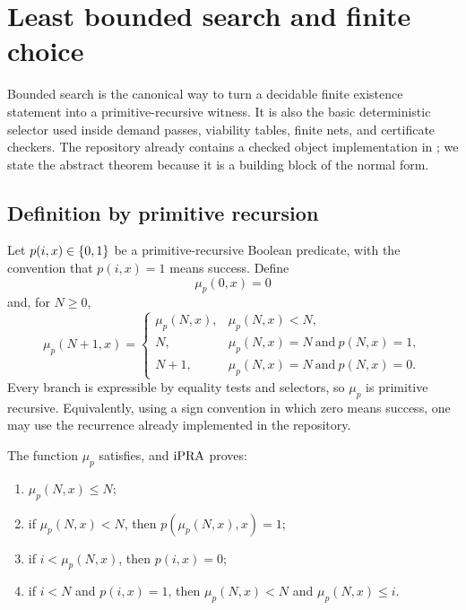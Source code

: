 \section{Least bounded search and finite choice}
\label{sec:search}

Bounded search is the canonical way to turn a decidable finite existence statement
into a primitive-recursive witness.  It is also the basic deterministic selector used
inside demand passes, viability tables, finite nets, and certificate checkers.  The
repository already contains a checked object implementation in
; we state the abstract theorem because it is a
building block of the normal form.

\subsection{Definition by primitive recursion}

Let \(p(i,x)\in\{0,1\}\) be a primitive-recursive Boolean predicate, with the convention
that \(p(i,x)=1\) means success.  Define
\[
 \mu_p(0,x)=0
\]
and, for \(N\ge0\),
\[
 \mu_p(N+1,x)=
 \begin{cases}
   \mu_p(N,x),&\mu_p(N,x)<N,\\
   N,&\mu_p(N,x)=N\ \text{and}\ p(N,x)=1,\\
   N+1,&\mu_p(N,x)=N\ \text{and}\ p(N,x)=0.
 \end{cases}
\]
Every branch is expressible by equality tests and selectors, so \(\mu_p\) is primitive
recursive.  Equivalently, using a sign convention in which zero means success, one may
use the recurrence already implemented in the repository.

\begin{theorem}
\label{thm:bounded-search}
The function \(\mu_p\) satisfies, and \(\mathrm{iPRA}\) proves:
\begin{enumerate}[label=(\roman*),leftmargin=2.4em]
\item \(\mu_p(N,x)\le N\);
\item if \(\mu_p(N,x)<N\), then \(p(\mu_p(N,x),x)=1\);
\item if \(i<\mu_p(N,x)\), then \(p(i,x)=0\);
\item if \(i<N\) and \(p(i,x)=1\), then
      \(\mu_p(N,x)<N\) and \(\mu_p(N,x)\le i\).
\end{enumerate}
\end{theorem}

